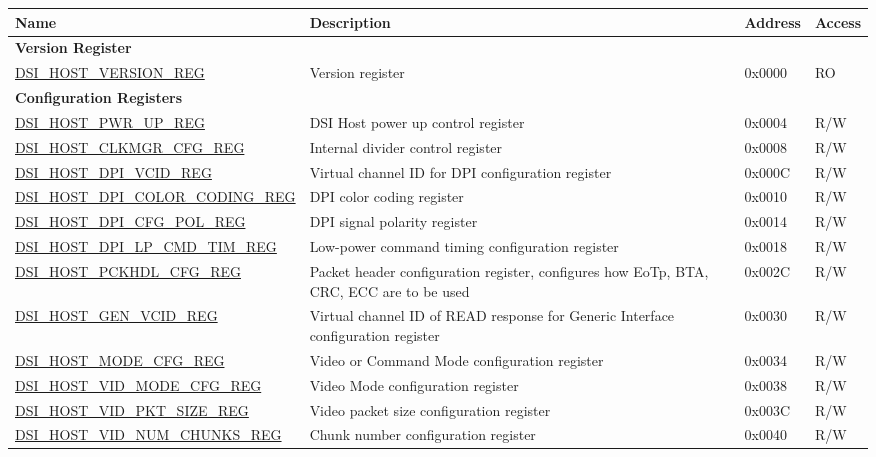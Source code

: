 \begin{longtable}{ | p{6.8cm} | p{6.5cm} | p{1.2cm} | p{1cm} | }
\hline\rowcolor{lightgray}
Name & Description &  Address & Access \\ \hline
\endhead
\multicolumn{4}{|l|}{\textbf{Version Register}} \\ \hline
\hyperref[regdesc:DSIHOSTVERSIONREG]{DSI\_HOST\_VERSION\_REG} & Version register & 0x0000 & RO \\ \hline
\multicolumn{4}{|l|}{\textbf{Configuration Registers}} \\ \hline
\hyperref[regdesc:DSIHOSTPWRUPREG]{DSI\_HOST\_PWR\_UP\_REG} & DSI Host power up control register & 0x0004 & R/W \\ \hline
\hyperref[regdesc:DSIHOSTCLKMGRCFGREG]{DSI\_HOST\_CLKMGR\_CFG\_REG} & Internal divider control register & 0x0008 & R/W \\ \hline
\hyperref[regdesc:DSIHOSTDPIVCIDREG]{DSI\_HOST\_DPI\_VCID\_REG} & Virtual channel ID for DPI configuration register & 0x000C & R/W \\ \hline
\hyperref[regdesc:DSIHOSTDPICOLORCODINGREG]{DSI\_HOST\_DPI\_COLOR\_CODING\_REG} & DPI color coding register & 0x0010 & R/W \\ \hline
\hyperref[regdesc:DSIHOSTDPICFGPOLREG]{DSI\_HOST\_DPI\_CFG\_POL\_REG} & DPI signal polarity register & 0x0014 & R/W \\ \hline
\hyperref[regdesc:DSIHOSTDPILPCMDTIMREG]{DSI\_HOST\_DPI\_LP\_CMD\_TIM\_REG} & Low-power command timing configuration register & 0x0018 & R/W \\ \hline
\hyperref[regdesc:DSIHOSTPCKHDLCFGREG]{DSI\_HOST\_PCKHDL\_CFG\_REG} & Packet header configuration register, configures how EoTp, BTA, CRC, ECC are to be used & 0x002C & R/W \\ \hline
\hyperref[regdesc:DSIHOSTGENVCIDREG]{DSI\_HOST\_GEN\_VCID\_REG} & Virtual channel ID of READ response for Generic Interface configuration register & 0x0030 & R/W \\ \hline
\hyperref[regdesc:DSIHOSTMODECFGREG]{DSI\_HOST\_MODE\_CFG\_REG} & Video or Command Mode configuration register & 0x0034 & R/W \\ \hline
\hyperref[regdesc:DSIHOSTVIDMODECFGREG]{DSI\_HOST\_VID\_MODE\_CFG\_REG} & Video Mode configuration register & 0x0038 & R/W \\ \hline
\hyperref[regdesc:DSIHOSTVIDPKTSIZEREG]{DSI\_HOST\_VID\_PKT\_SIZE\_REG} & Video packet size configuration register & 0x003C & R/W \\ \hline
\hyperref[regdesc:DSIHOSTVIDNUMCHUNKSREG]{DSI\_HOST\_VID\_NUM\_CHUNKS\_REG} & Chunk number configuration register & 0x0040 & R/W \\ \hline

\end{longtable}
